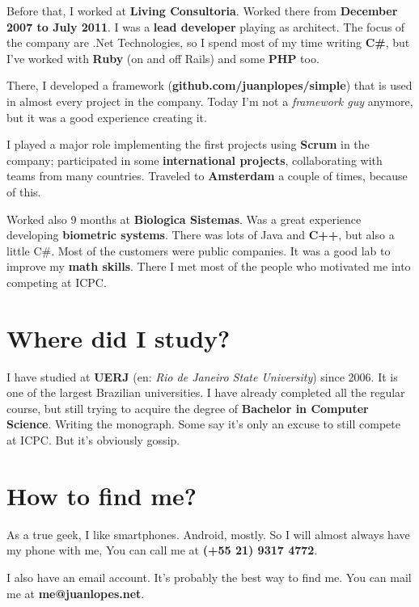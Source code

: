 \documentclass[a4paper,12pt,notitlepage]{article}
\begin{document}
	Before that, I worked at \textbf{Living Consultoria}. Worked there from \textbf{December 2007 to July 2011}. I was a \textbf{lead developer} playing as architect. The focus of the company are .Net Technologies, so I spend most of my time writing \textbf{C\#}, but I’ve worked with \textbf{Ruby} (on and off Rails) and some \textbf{PHP} too. 
	
	There, I developed a framework (\textbf{github.com/juanplopes/simple}) that is used in almost every project in the company. Today I'm not a \emph{framework guy} anymore, but it was a good experience creating it. 
	
	I played a major role implementing the first projects using \textbf{Scrum} in the company; participated in some \textbf{international projects}, collaborating with teams from many countries. Traveled to \textbf{Amsterdam} a couple of times, because of this.
	
	Worked also 9 months at \textbf{Biologica Sistemas}. Was a great experience developing \textbf{biometric systems}. There was lots of Java and \textbf{C++}, but also a little C\#. Most of the customers were public companies. It was a good lab to improve my \textbf{math skills}. There I met most of the people who motivated me into competing at ICPC.

\section{Where did I study?}

	I have studied at \textbf{UERJ} (en: \emph{Rio de Janeiro State University}) since 2006. It is one of the largest Brazilian universities. I have already completed all the regular course, but still trying to acquire the degree of \textbf{Bachelor in Computer Science}. Writing the monograph. Some say it’s only an excuse to still compete at ICPC. But it’s obviously gossip.

\section{How to find me?}

	As a true geek, I like smartphones. Android, mostly. So I will almost always have my phone with me, You can call me at \textbf{(+55 21) 9317 4772}.
	
	I also have an email account. It’s probably the best way to find me. You can mail me at \textbf{me@juanlopes.net}.
\end{document}

